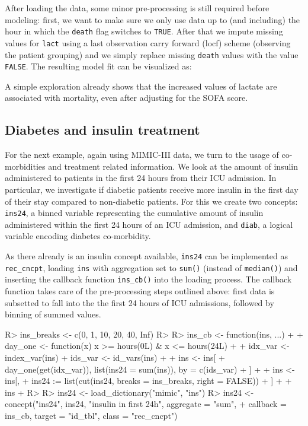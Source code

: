 \documentclass[
  notitle]{jss}
\begin{document}
After loading the data, some minor pre-processing is still required
before modeling: first, we want to make sure we only use data up to (and
including) the hour in which the \texttt{death} flag switches to
\texttt{TRUE}. After that we impute missing values for \texttt{lact}
using a last observation carry forward (locf) scheme (observing the
patient grouping) and we simply replace missing \texttt{death} values
with the value \texttt{FALSE}. The resulting model fit can be visualized
as:

A simple exploration already shows that the increased values of lactate
are associated with mortality, even after adjusting for the SOFA score.

\hypertarget{diabetes-and-insulin-treatment}{%
\subsection{Diabetes and insulin
treatment}\label{diabetes-and-insulin-treatment}}

For the next example, again using MIMIC-III data, we turn to the usage
of co-morbidities and treatment related information. We look at the
amount of insulin administered to patients in the first 24 hours from
their ICU admission. In particular, we investigate if diabetic patients
receive more insulin in the first day of their stay compared to
non-diabetic patients. For this we create two concepts: \texttt{ins24},
a binned variable representing the cumulative amount of insulin
administered within the first 24 hours of an ICU admission, and
\texttt{diab}, a logical variable encoding diabetes co-morbidity.

As there already is an insulin concept available, \texttt{ins24} can be
implemented as \texttt{rec\_cncpt}, loading \texttt{ins} with
aggregation set to \texttt{sum()} (instead of \texttt{median()}) and
inserting the callback function \texttt{ins\_cb()} into the loading
process. The callback function takes care of the pre-processing steps
outlined above: first data is subsetted to fall into the the first 24
hours of ICU admissions, followed by binning of summed values.

\begin{CodeChunk}
\begin{CodeInput}
R> ins_breaks <- c(0, 1, 10, 20, 40, Inf)
R> 
R> ins_cb <- function(ins, ...) {
+ 
+   day_one <- function(x) x >= hours(0L) & x <= hours(24L)
+ 
+   idx_var <- index_var(ins)
+   ids_var <- id_vars(ins)
+ 
+   ins <- ins[
+     day_one(get(idx_var)), list(ins24 = sum(ins)), by = c(ids_var)
+   ]
+ 
+   ins <- ins[,
+     ins24 := list(cut(ins24, breaks = ins_breaks, right = FALSE))
+   ]
+ 
+   ins
+ }
R> 
R> ins24 <- load_dictionary("mimic", "ins")
R> ins24 <- concept("ins24", ins24, "insulin in first 24h", aggregate = "sum",
+                  callback = ins_cb, target = "id_tbl", class = "rec_cncpt")
\end{CodeInput}
\end{CodeChunk}
\end{document}
